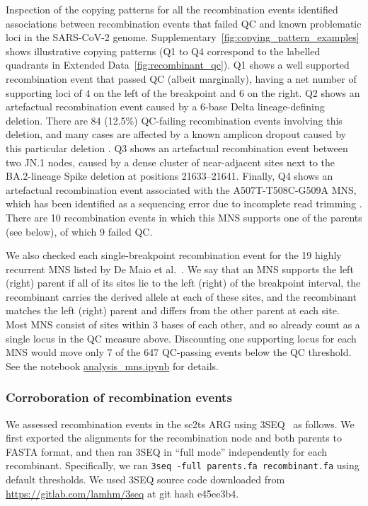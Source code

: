 \documentclass[12pt]{article}
\newcommand{\edref}[1]{Extended Data~\ref{#1}}
\newcommand{\siref}[1]{Supplementary~\ref{#1}}
\begin{document}
Inspection of the copying patterns for all the recombination events
identified associations between recombination events that failed QC and
known problematic loci in the SARS-CoV-2 genome.
\siref{fig:copying_pattern_examples} shows illustrative copying patterns
(Q1 to Q4 correspond to the labelled quadrants in \edref{fig:recombinant_qc}).
Q1 shows a well supported recombination event that passed QC (albeit marginally),
having a net number of supporting loci of 4 on the left of the breakpoint
and 6 on the right.
Q2 shows an artefactual recombination event
caused by a 6-base Delta lineage-defining deletion.
There are 84 (12.5\%) QC-failing recombination events involving this deletion, and
many cases are affected by a known amplicon dropout
caused by this particular deletion \cite{Sanderson2021}.
Q3 shows an artefactual recombination event between two JN.1 nodes,
caused by a dense cluster of near-adjacent sites next to
the BA.2-lineage Spike deletion at positions 21633--21641.
Finally, Q4 shows an artefactual recombination event
associated with the A507T-T508C-G509A MNS,
which has been identified as a sequencing error
due to incomplete read trimming \cite{DeMaio2024}.
There are 10 recombination events in which this MNS supports one of the parents
(see below), of which 9 failed QC.

We also checked each single-breakpoint recombination event for the
19 highly recurrent MNS listed by De Maio et al.~\cite{DeMaio2024}.
We say that an MNS supports the left (right) parent if
all of its sites lie to the left (right) of the breakpoint interval,
the recombinant carries the derived allele at each of these sites,
and the recombinant matches the left (right) parent
and differs from the other parent at each site.
Most MNS consist of sites within 3 bases of each other, and so
already count as a single locus in the QC measure above.
Discounting one supporting locus for each MNS
would move only 7 of the 647 QC-passing events below the QC threshold.
See the notebook
\href{https://github.com/jeromekelleher/sc2ts-paper/blob/main/notebooks/analysis\_mns.ipynb}{analysis\_mns.ipynb}
for details.

\subsubsection*{Corroboration of recombination events}

We assessed recombination events in the sc2ts ARG
using 3SEQ~\cite{Lam2018improved} as follows.
We first exported the alignments for the recombination node and both
parents to FASTA format, and then ran 3SEQ in ``full mode''
independently for each recombinant. Specifically, we
ran \texttt{3seq -full parents.fa recombinant.fa}
using default thresholds.
We used 3SEQ source code downloaded from \url{https://gitlab.com/lamhm/3seq}
at git hash e45ee3b4.
\end{document}
